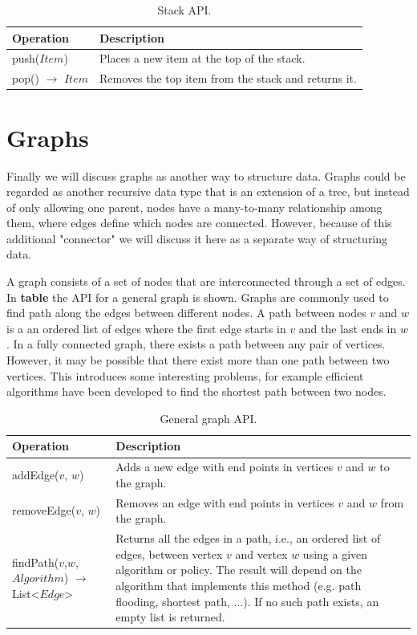 \begin{table}[H]
	\caption{Stack API.}
	\label{tab:api:stack}
	\begin{tabular}{p{150px} | p{250px}}
		\textbf{Operation} & \textbf{Description} \\
		\hline
		push($Item$) & Places a new item at the top of the stack. \\
		pop() $\rightarrow$ $Item$ & Removes the top item from the stack and returns it. \\
		\hline
	\end{tabular}
\end{table}



\section{Graphs}

Finally we will discuss graphs as another way to structure data. Graphs could be regarded as another recursive data type that is an extension of a tree, but instead of only allowing one parent, nodes have a many-to-many relationship among them, where edges define which nodes are connected. However, because of this additional "connector" we will discuss it here as a separate way of structuring data.

A graph consists of a set of nodes that are interconnected through a set of edges. In \textbf{table} the API for a general graph is shown. Graphs are commonly used to find path along the edges between different nodes. A path between nodes $v$ and $w$ is a an ordered list of edges where the first edge starts in $v$ and the last ends in $w$. In a fully connected graph, there exists a path between any pair of vertices. However, it may be possible that there exist more than one path between two vertices. This introduces some interesting problems, for example efficient algorithms have been developed to find the shortest path between two nodes.

\begin{table}[H]
	\caption{General graph API.}
	\label{tab:api:graph}
	\begin{tabular}{p{150px} | p{250px}}
		\textbf{Operation} & \textbf{Description} \\
		\hline
		addEdge($v$, $w$) & Adds a new edge with end points in vertices $v$ and $w$ to the graph. \\
		removeEdge($v$, $w$) & Removes an edge with end points in vertices $v$ and $w$ from the graph. \\
		findPath($v$,$w$,$Algorithm$)  $\rightarrow$ List<$Edge$> & Returns all the edges in a path, i.e., an ordered list of edges, between vertex $v$ and vertex $w$ using a given algorithm or policy. The result will depend on the algorithm that implements this method (e.g. path flooding, shortest path, ...). If no such path exists, an empty list is returned. \\
		\hline
	\end{tabular}
\end{table}

